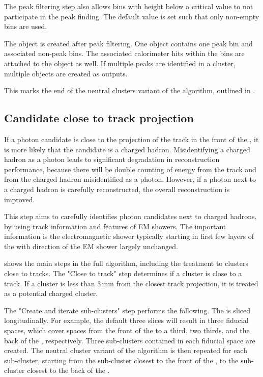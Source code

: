 The peak filtering step also allows bins with height below a critical value to not participate in the peak finding. The default value is set such that only non-empty bins are used.

The \ShowerPeak  object is created after peak filtering. One \ShowerPeak object contains one peak bin and associated non-peak bins. The associated calorimeter hits within the bins are attached to the \ShowerPeak object as well. If multiple peaks are identified in a cluster, multiple \ShowerPeak objects are created as outputs.

This marks the end of the neutral clusters variant of the \PhotonReconstruction algorithm, outlined in .


\subsection{Candidate close to track projection}
\label{sec:photon2Dtrack}
If  a photon candidate is close to the projection of the track in the front of the \ECAL, it is more likely that the candidate is a charged hadron. Misidentifying a charged hadron as a photon leads to significant degradation in reconstruction performance, because there will be double counting of energy from the track and from the charged hadron misidentified as a photon. However, if a photon next to a charged hadron is carefully reconstructed, the overall reconstruction is improved.

This step aims to carefully identifies photon candidates next to charged hadrons, by using track information and features of EM showers. The important information is the electromagnetic shower typically starting in first few layers of the \ECAL with direction of the EM shower largely unchanged.


 shows the main steps in the full \peakFinding algorithm, including the treatment to clusters close to tracks. The "Close to track" step determines if a cluster is close to a track. If a cluster is less than 3\,mm from the closest track projection, it is treated as a potential charged cluster.



The "Create and iterate sub-clusters" step performs the following. The \ECAL is sliced longitudinally. For example, the default three slices will result in three \ECAL fiducial spaces, which cover spaces from the front of the \ECAL to a third, two thirds, and the back of the \ECAL, respectively. Three sub-clusters contained in each fiducial space are created. The neutral cluster variant of the  \peakFinding algorithm is then repeated for each sub-cluster, starting from the sub-cluster closest to the front of the \ECAL, to the sub-cluster closest to the back of the \ECAL.

